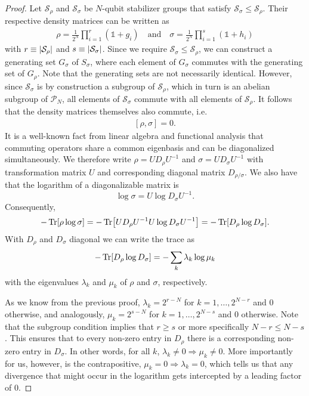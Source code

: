 \begin{proof}
   Let $\mathcal{S}_\rho$ and $\mathcal{S}_\sigma$ be $N$-qubit stabilizer
   groups that satisfy $\mathcal{S}_\sigma \leq \mathcal{S}_\rho$. Their
   respective density matrices can be written as
   \begin{align}
     \rho = \frac{1}{2^N} \prod_{i=1}^r (\mathds{1} + g_i) \quad{\text{and}}
       \quad \sigma = \frac{1}{2^N} \prod_{i=1}^s (\mathds{1} + h_i)
   \end{align}
   with $r \equiv \abs{\mathcal{S}_\rho}$ and $s \equiv
   \abs{\mathcal{S}_\sigma}$. Since we require $\mathcal{S}_\sigma \leq
   \mathcal{S}_\rho$, we can construct a generating set $G_\sigma$ of
   $S_\sigma$, where each element of $G_\sigma$ commutes with the generating
   set of $G_\rho$. Note that the generating sets are not necessarily
   identical. However, since $\mathcal{S}_\sigma$ is by construction a subgroup
   of $\mathcal{S}_\rho$, which in turn is an abelian subgroup of
   $\mathcal{P}_N$, all elements of $\mathcal{S}_\sigma$ commute with all elements of
   $\mathcal{S}_\rho$. It follows that the density matrices themselves also
   commute, i.e.
   \begin{align}
      \left[\rho, \sigma\right] = 0
   .\end{align}
   It is a well-known fact from linear algebra and functional analysis that
   commuting operators share a common eigenbasis and can be diagonalized
   simultaneously. We therefore write $\rho = UD_\rho U^{-1}$ and $\sigma =
   UD_\sigma U^{-1}$ with transformation matrix $U$ and corresponding diagonal
   matrix $D_{\rho / \sigma}$. We also have that the logarithm of a diagonalizable
   matrix is \cite{hallElementaryIntroductionGroups2000}
   $$\log \sigma = U \log D_\sigma U^{-1}.$$ Consequently,
   \begin{align}
      -\Tr[\rho \log\sigma] = -\Tr[U D_\rho U^{-1} U \log D_\sigma U^{-1}] =
      -\Tr[D_\rho \log D_\sigma] 
   .\end{align}
   With $D_\rho$ and $D_\sigma$ diagonal we can write the trace as
   \begin{align}\label{eq:the-sum}
      -\Tr[D_\rho \log D_\sigma] = -\sum_k \lambda_k \log \mu_k
   \end{align}
   with the eigenvalues $\lambda_k$ and $\mu_k$ of $\rho$ and $\sigma$,
   respectively.

   As we know from the previous proof, $\lambda_k = 2^{r-N}$ for
   $k=1,\ldots,2^{N-r}$ and $0$ otherwise, and analogously, $\mu_k = 2^{s-N}$
   for $k=1,\ldots,2^{N-s}$ and $0$ otherwise. Note that the subgroup condition
   implies that $r\geq s$ or more specifically $N-r \leq N-s$. This ensures that to every non-zero entry in
   $D_\rho$ there is a corresponding non-zero entry in $D_\sigma$. In other
   words, for all $k$, $\lambda_k \neq 0 \Rightarrow \mu_k \neq 0$. More
   importantly for us, however, is the contrapositive, $\mu_k = 0 \Rightarrow
   \lambda_k = 0$, which tells us that any divergence that might occur
   in the logarithm gets intercepted by a leading factor of $0$.


\end{proof}

